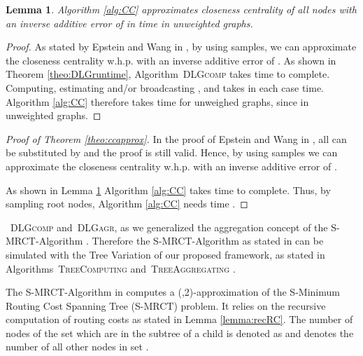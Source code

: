 \documentclass[11pt]{article}
\newtheorem{lemma}[theorem]{Lemma}
\newcommand{\todoI}[1]{}\newcommand{\blueI}[1]{}
\newif\iffull
\begin{document}
\begin{lemma}
Algorithm \ref{alg:CC} approximates closeness centrality of all nodes with an inverse additive error of  in time  in unweighted graphs.
\label{lemma:ccunweighted}
\end{lemma}

\begin{proof}
As stated by Epstein and Wang in \cite{eppstein:2001:fastCCapprox}, by using  samples, we can approximate the closeness centrality w.h.p. with an inverse additive error of . As shown in Theorem \ref{theo:DLGruntime}, Algorithm\iffull~\ref{alg:DLGcomp}\fi~\textsc{DLGcomp} takes  time to complete. Computing, estimating and/or broadcasting ,  and  takes in each case  time. Algorithm \ref{alg:CC} therefore takes  time for unweighed graphs, since  in unweighted graphs.
\end{proof} 



\begin{proof}[Proof of Theorem \ref{theo:ccapprox}]
In the proof of Epstein and Wang in \cite{eppstein:2001:fastCCapprox}, all  can be substituted by  and the proof is still valid. Hence, by using  samples we can approximate the closeness centrality w.h.p. with an inverse additive error of .

As shown in Lemma \ref{lemma:ccunweighted} Algorithm \ref{alg:CC} takes  time to complete. Thus, by sampling  root nodes, Algorithm \ref{alg:CC} needs  time .
\end{proof} 
\fi

\iffull
\subsection{Minimum Routing Cost Tree}
\label{app:MRCT}

The S-MRCT-Algorithm in \cite{hochuli:holzer:MRCST} is executed in a similar fashion as our proposed Algorithms\iffull~\ref{alg:DLGcomp}\fi~\textsc{DLGcomp} and\iffull~\ref{alg:DLGagr}\fi~\textsc{DLGagr}, as we generalized the aggregation concept of the S-MRCT-Algorithm \cite{hochuli:holzer:MRCST}.
Therefore the S-MRCT-Algorithm as stated in \cite{hochuli:holzer:MRCST} can be simulated with the Tree Variation of our proposed framework, as stated in Algorithms\iffull~\ref{alg:TreeComputing}\fi~\textsc{TreeComputing} and\iffull~\ref{alg:TreeAggregating}\fi~\textsc{TreeAggregating} .


The S-MRCT-Algorithm in \cite{hochuli:holzer:MRCST} computes a (,2)-approximation of the S-Minimum Routing Cost Spanning Tree (S-MRCT) problem. It relies on the recursive computation of  routing costs as stated in Lemma \ref{lemma:recRC}. The number of nodes of the set  which are in the subtree of a child  is denoted as  and  \todoI{update} denotes the number of all other nodes in set .
\end{document}
